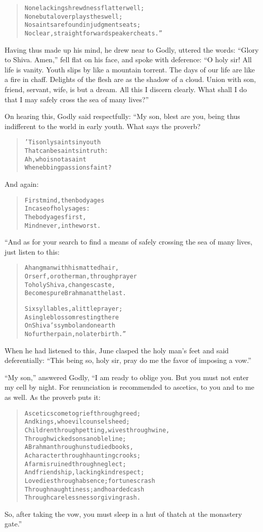\documentclass[article, twoside, 14pt]{memoir}
\renewenvironment{verbatim}{%
\begin{quote}%
\vskip -10pt%
\begin{alltt}\normalfont\large}{\end{alltt}%
\end{quote}%
\vskip -10pt
} %
\begin{document}
\begin{verbatim}
None lacking shrewdness flatter well;
None but a lover plays the swell;
No saints are found in judgment seats;
No clear, straightforward speaker cheats.”
\end{verbatim}
Having thus made up his mind, he drew near to Godly, uttered the
words: ``Glory to Shiva. Amen,'' fell flat on his face, and spoke
with deference:
``O holy sir! All life is vanity. Youth slips by like a mountain torrent. The days of our life are like a fire in chaff. Delights of the flesh are as the shadow of a cloud. Union with son, friend, servant, wife, is but a dream. All this I discern clearly. What shall I do that I may safely cross the sea of many lives?''

On hearing this, Godly said respectfully: “My son, blest are you,
being thus indifferent to the world in early youth. What says
the proverb?

\begin{verbatim}
'Tis only saints in youth
That can be saints in truth:
Ah, who is not a saint
When ebbing passions faint?
\end{verbatim}
And again:

\begin{verbatim}
First mind, then body ages
In case of holy sages:
The body ages first,
Mind never, in the worst.
\end{verbatim}
“And as for your search to find a means of safely crossing the sea
of many lives, just listen to this:

\begin{verbatim}
A hangman with his matted hair,
Or serf, or other man, through prayer
To holy Shiva, changes caste,
Becomes pure Brahman at the last.

Six syllables, a little prayer;
A single blossom resting there
On Shiva's symbol{\textemdash}and on earth
No further pain, no later birth.”
\end{verbatim}
When he had listened to this, June clasped the holy man's feet and
said deferentially:
``This being so, holy sir, pray do me the favor of imposing a vow.''

``My son,'' answered Godly, “I am ready to oblige you. But you must
not enter my cell by night. For renunciation is recommended to
ascetics, to you and to me as well. As the proverb puts it:

\begin{verbatim}
Ascetics come to grief through greed;
And kings, who evil counsels heed;
Children through petting, wives through wine,
Through wicked sons a noble line;
A Brahman through unstudied books,
A character through haunting crooks;
A farm is ruined through neglect;
And friendship, lacking kind respect;
Love dies through absence; fortunes crash
Through naughtiness; and hoarded cash
Through carelessness or giving rash.
\end{verbatim}
So, after taking the vow, you must sleep in a hut of thatch at the
monastery gate.”
\end{document}
